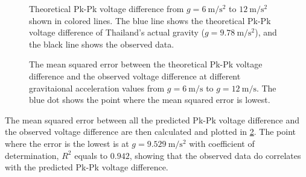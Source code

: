 \begin{figure}[ht]
	\centering
	
	\caption{Theoretical Pk-Pk voltage difference from $g = \qty{6}{\meter\per\second^2}$ to $\qty{12}{\meter\per\second^2}$ shown in colored lines. The blue line shows the theoretical Pk-Pk voltage difference of Thailand's actual gravity ($g = \qty{9.78}{\meter\per\second^2}$), and the black line shows the observed data.}
	\label{fig:theoretical-pk-pk}
\end{figure}
\begin{figure}[ht]
	\centering
	
	\caption{The mean squared error between the theoretical Pk-Pk voltage difference and the observed voltage difference at different gravitaional acceleration values from $g = \qty{6}{\meter\per\second}$ to $g = \qty{12}{\meter\per\second}$. The blue dot shows the point where the mean squared error is lowest.}
	\label{fig:mse-gravity}
\end{figure}

The mean squared error between all the predicted Pk-Pk voltage difference and the observed voltage difference are then calculated and plotted in \cref{fig:mse-gravity}. The point where the error is the lowest is at $g = \qty{9.529}{\meter\per\second^2}$ with coefficient of determination, $R^2$ equals to $0.942$, showing that the observed data do correlates with the predicted Pk-Pk voltage difference.

